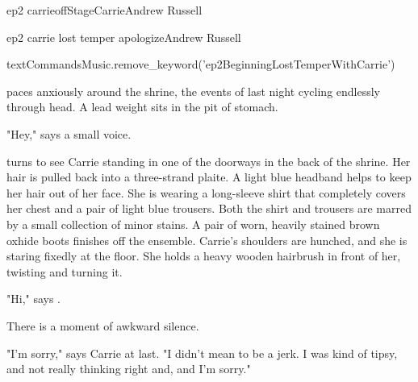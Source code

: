 \documentclass{book}
\begin{document}
\begin{node}{ep2 carrie}{offStage}{Carrie}{Andrew Russell}



\end{node}

\begin{childnode}{ep2 carrie lost temper apologize}{Andrew Russell}

    \begin{code}

        textCommandsMusic.remove_keyword('ep2BeginningLostTemperWithCarrie')

    \end{code}

    \name{} paces anxiously around the shrine, the events of last night cycling endlessly through \hisher{} head. A lead weight sits in the pit of \hisher{} stomach.

    "Hey," says a small voice.

    \name{} turns to see Carrie standing in one of the doorways in the back of the shrine. Her hair is pulled back into a three-strand plaite. A light blue headband helps to keep her hair out of
    her face. She is wearing a long-sleeve shirt that completely 
    covers her chest and a pair of light blue trousers. Both the shirt and trousers are marred by a small collection of minor stains. A pair of worn, heavily stained brown oxhide 
    boots finishes off the ensemble. Carrie's shoulders are hunched, and she is staring fixedly at the floor. She holds a heavy wooden hairbrush in front of her, twisting and turning it.

    "Hi," says \name{}.

    There is a moment of awkward silence.

    "I'm sorry," says Carrie at last. "I didn't mean to be a jerk. I was kind of tipsy, and not really thinking right and, and I'm sorry."



\end{childnode}
\end{document}
